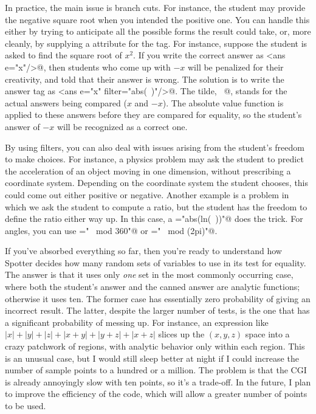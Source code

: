 \documentclass{doc}
\begin{document}
In practice, the main issue is branch cuts. For instance, the student may provide the
negative square root when you intended the positive one. You can handle this either
by trying to anticipate all the possible forms the result could take, or, more cleanly,
 by supplying a \verb@filter@ attribute for the \verb@ans@ tag. For instance, suppose the
 student is asked to find the square root of $x^2$. If you write the correct answer
 as \verb@<ans e="x"/>@, then students who come up with $-x$ will be penalized for
 their creativity, and told that their answer is wrong. The solution is to write
 the answer tag as \verb@<ans e="x" filter="abs(~)"/>@.
 The tilde, \verb@~@, stands for the actual answers being compared ($x$ and $-x$).
 The absolute value function is applied to these answers before they are compared
 for equality, so the student's answer of $-x$ will be recognized as a correct one.
  
 By using filters, you can also deal with issues arising from the student's freedom
 to make choices. For instance, a physics problem may ask the student to predict
 the acceleration of an object moving in one dimension, without prescribing
 a coordinate system. Depending on the coordinate
 system the student chooses, this could come out either positive or negative.
 Another example is a problem in which we ask the student to compute a ratio,
 but the student has the freedom to define the ratio either way up. In this
 case, a \verb@filter="abs(ln(~))"@ does the trick. For angles, you can
 use \verb@filter="~ mod 360"@ or \verb@filter="~ mod (2pi)"@.

 If you've absorbed everything so far, then you're ready to understand how
 Spotter decides how many random sets of variables to use in its test for
 equality. The answer is that it uses only \emph{one} set in the most
 commonly occurring case, where both the student's answer and the canned
 answer are analytic functions; otherwise it uses ten. The former case
 has essentially zero probability of giving an incorrect result. The latter,
 despite the larger number of tests, is the one that has a significant
 probability of messing up. For instance, an expression like
 $|x|+|y|+|z|+|x+y|+|y+z|+|x+z|$ slices up the $(x,y,z)$ space into a crazy
 patchwork of regions, with analytic behavior only within each region.
 This is an unusual case, but I would still sleep better at night if I
 could increase the number of sample points to a hundred or a million.
 The problem is that the CGI is already annoyingly slow with ten points, so
 it's a trade-off. In the future, I plan to improve the efficiency of the
 code, which will allow a greater number of points to be used.
\end{document}
